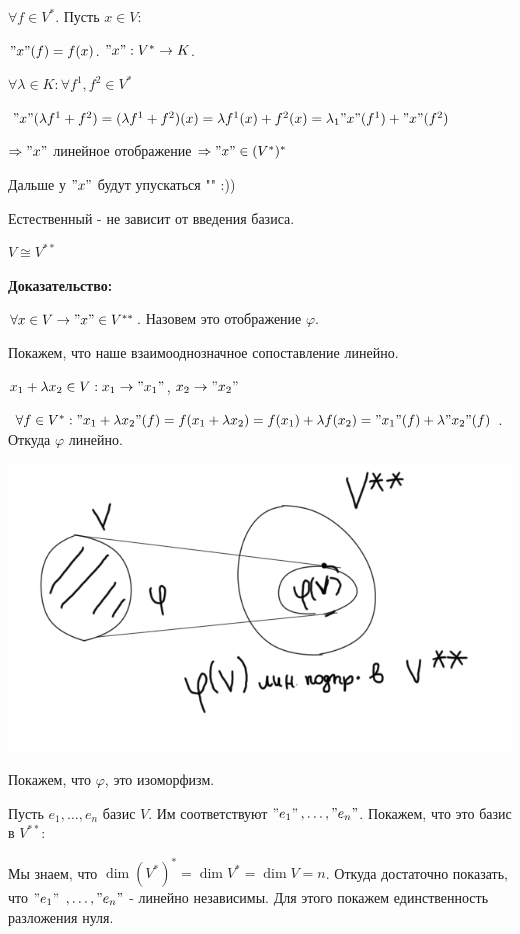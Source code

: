 $\forall f \in V^*$. Пусть $x \in V$:

$"x"(f) = f(x)$. $"x": V^* \rightarrow K$.

$\forall \lambda \in K: \forall f^1,f^2 \in V^*$

$"x"(\lambda f^1+f^2) = (\lambda f^1 + f^2)(x) = \lambda f^1(x) + f^2(x) = \lambda_1 "x"(f^1) + "x"(f^2)$

$\Rightarrow "x"$ линейное отображение $\Rightarrow"x" \in (V^*)^*$

Дальше у $"x"$ будут упускаться "" :))


Естественный - не зависит от введения базиса.

$V \cong V^{**}$

\textbf{Доказательство:}

$\forall x \in V \rightarrow "x"\in V^{**}$. Назовем это отображение $\varphi$.

Покажем, что наше взаимооднозначное сопоставление линейно.

$x_1 + \lambda x_2 \in V: x_1 \rightarrow "x_1"$, $x_2 \rightarrow "x_2"$


$\forall f\in V^*: "x_1+\lambda x_2"(f) = f(x_1+\lambda x_2) = f(x_1) + \lambda f(x_2) = "x_1"(f) + \lambda"x_2"(f) $. Откуда $\varphi$ линейно.

\begin{center}
    \includegraphics[width =15cm]{assets/8_1-varphi-linear.png}
\end{center}

Покажем, что $\varphi$, это изоморфизм.

Пусть $e_1,\ldots, e_n$ базис $V$. Им соответствуют $ "e_1"$$,\ldots, "e_n"$. Покажем, что это базис в $V^{**}$:

Мы знаем, что $\dim (V^*)^* = \dim V^* = \dim V = n$. Откуда достаточно показать, что $"e_1"$ $,\ldots, "e_n"$ - линейно независимы. Для этого покажем единственность разложения нуля.

